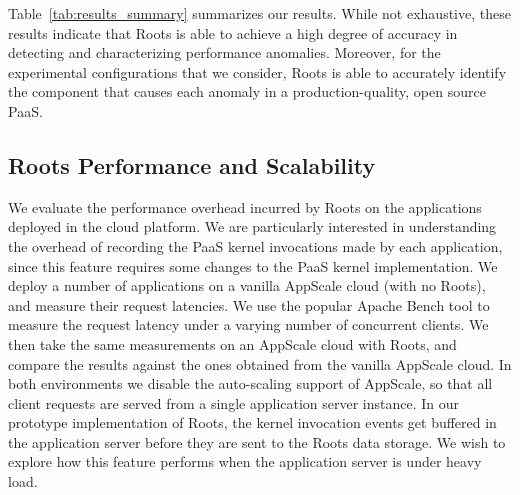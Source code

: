 Table~\ref{tab:results_summary} summarizes our results.
While not exhaustive, these results indicate that Roots is able to achieve a
high degree of accuracy in detecting and characterizing performance anomalies.
Moreover, for the experimental configurations that we consider, Roots is able to accurately identify
the component that causes each anomaly in a production-quality, open source PaaS.

\subsection{Roots Performance and Scalability}

We evaluate the performance overhead incurred by Roots on the applications deployed in the 
cloud platform. We are particularly interested in understanding the overhead of recording the PaaS kernel
invocations made by each application, since this feature requires some changes to the PaaS kernel
implementation. 
We deploy a number of applications on a vanilla
AppScale cloud (with no Roots), and measure their request latencies. We use
the popular Apache Bench tool to measure the request latency under a
varying number of concurrent clients. We then take the same measurements
on an AppScale cloud with Roots, and compare the results against the ones obtained
from the vanilla AppScale cloud. In both environments we disable the auto-scaling
support of AppScale, so that all client requests are served from a single application
server instance. In our prototype implementation of Roots, the kernel invocation events get buffered in
the application server before they are sent to the Roots data storage. We wish to
explore how this feature performs when the application server is under heavy load.

